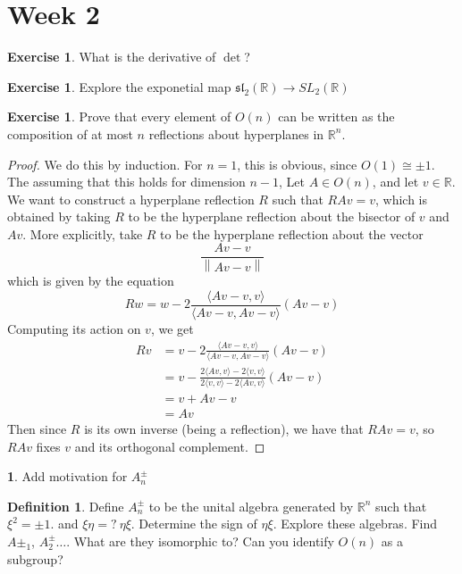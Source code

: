 \documentclass[psamsfonts]{amsart}
\theoremstyle{definition}
\newtheorem{defn}[thm]{Definition}
\newtheorem{exer}[thm]{Exercise}
\newtheorem{TODO}{\ib{TODO}}
\theoremstyle{remark}
\newcommand{\R}{\mathbb{R}}
\newcommand{\ib}[1]{\textbf{\textit{#1}}}
\newcommand{\norm}[1]{\left\lVert#1\right\rVert}
\begin{document}
\section*{Week 2}
\begin{exer}
What is the derivative of $\det$?
\end{exer}
%
\begin{exer}
Explore the exponetial map $\mathfrak{sl}_2(\R) \to SL_2(\R)$
\end{exer}
%
\begin{exer}
Prove that every element of $O(n)$ can be written as the composition of at most $n$ reflections about hyperplanes in $\R^n$.
\end{exer}
%
\begin{proof}
We do this by induction. For $n = 1$, this is obvious, since $O(1) \cong \pm 1$. The assuming that this holds for dimension $n-1$, Let $A \in O(n)$, and let $v \in \R$. We want to construct a hyperplane reflection $R$ such that $RAv = v$, which is obtained by taking $R$ to be the hyperplane reflection about the bisector of $v$ and $Av$. More explicitly, take $R$ to be the hyperplane reflection about the vector 
$$\frac{Av - v}{\norm{Av - v}} $$
which is given by the equation
$$Rw = w - 2 \frac{\langle Av - v, v \rangle}{\langle Av - v, Av - v \rangle}(Av - v) $$
Computing its action on $v$, we get 
\begin{align*}
Rv &= v - 2 \frac{\langle Av - v, v \rangle}{\langle Av - v, Av - v \rangle}(Av - v) \\
&= v - \frac{2\langle Av, v \rangle - 2\langle v, v \rangle}{2 \langle v, v \rangle - 2 \langle Av, v \rangle}(Av - v) \\
&= v + Av -v \\
&= Av
\end{align*}
Then since $R$ is its own inverse (being a reflection), we have that $RAv = v$, so $RAv$ fixes $v$ and its orthogonal complement.
\end{proof}
%
\begin{TODO}
Add motivation for $A^\pm_n$
\end{TODO}
%
\begin{defn}
Define $A^\pm_n$ to be the unital algebra generated by $\R^n$ such that $\xi^2 = \pm 1$. and $\xi\eta = ?~\eta\xi$. Determine the sign of $\eta\xi$. Explore these algebras. Find $A\pm_1$, $A^\pm_2 \ldots$. What are they isomorphic to? Can you identify $O(n)$ as a subgroup?
\end{defn}
%
\setcounter{section}{3}
%
\setcounter{thm}{0}
%
\end{document}

